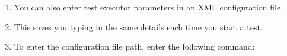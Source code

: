 
\begin{enumerate}
\item You can also enter test executor parameters in an XML configuration file.
\item This saves you typing in the same details each time you start a test.
\item To enter the configuration file path, enter the following command:\\


\end{enumerate}
